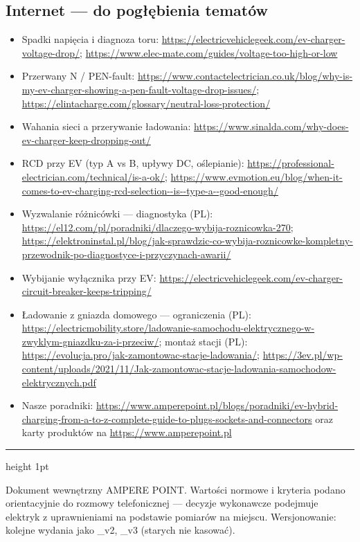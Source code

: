 \documentclass[11pt]{article}
\begin{document}
\subsection{Internet — do pogłębienia tematów}
\begin{itemize}
\item Spadki napięcia i diagnoza toru: \url{https://electricvehiclegeek.com/ev-charger-voltage-drop/}; \url{https://www.elec-mate.com/guides/voltage-too-high-or-low}
\item Przerwany N / PEN-fault: \url{https://www.contactelectrician.co.uk/blog/why-is-my-ev-charger-showing-a-pen-fault-voltage-drop-issues/}; \url{https://elintacharge.com/glossary/neutral-loss-protection/}
\item Wahania sieci a przerywanie ładowania: \url{https://www.sinalda.com/why-does-ev-charger-keep-dropping-out/}
\item RCD przy EV (typ A vs B, upływy DC, oślepianie): \url{https://professional-electrician.com/technical/is-a-ok/}; \url{https://www.evmotion.eu/blog/when-it-comes-to-ev-charging-rcd-selection--is--type-a--good-enough/}
\item Wyzwalanie różnicówki — diagnostyka (PL): \url{https://el12.com/pl/poradniki/dlaczego-wybija-roznicowka-270}; \url{https://elektroninstal.pl/blog/jak-sprawdzic-co-wybija-roznicowke-kompletny-przewodnik-po-diagnostyce-i-przyczynach-awarii/}
\item Wybijanie wyłącznika przy EV: \url{https://electricvehiclegeek.com/ev-charger-circuit-breaker-keeps-tripping/}
\item Ładowanie z gniazda domowego — ograniczenia (PL): \url{https://electricmobility.store/ladowanie-samochodu-elektrycznego-w-zwyklym-gniazdku-za-i-przeciw/}; montaż stacji (PL): \url{https://evolucja.pro/jak-zamontowac-stacje-ladowania/}; \url{https://3ev.pl/wp-content/uploads/2021/11/Jak-zamontowac-stacje-ladowania-samochodow-elektrycznych.pdf}
\item Nasze poradniki: \url{https://www.amperepoint.pl/blogs/poradniki/ev-hybrid-charging-from-a-to-z-complete-guide-to-plugs-sockets-and-connectors} oraz karty produktów na \url{https://www.amperepoint.pl}
\end{itemize}

\vspace{6pt}
{\color{rulegrey}\hrule height 1pt}\vspace{4pt}
{\footnotesize\sffamily Dokument wewnętrzny AMPERE POINT. Wartości normowe i kryteria podano orientacyjnie do rozmowy telefonicznej — decyzje wykonawcze podejmuje elektryk z uprawnieniami na podstawie pomiarów na miejscu. Wersjonowanie: kolejne wydania jako \_\allowbreak v2, \_\allowbreak v3 (starych nie kasować).}
\end{document}
